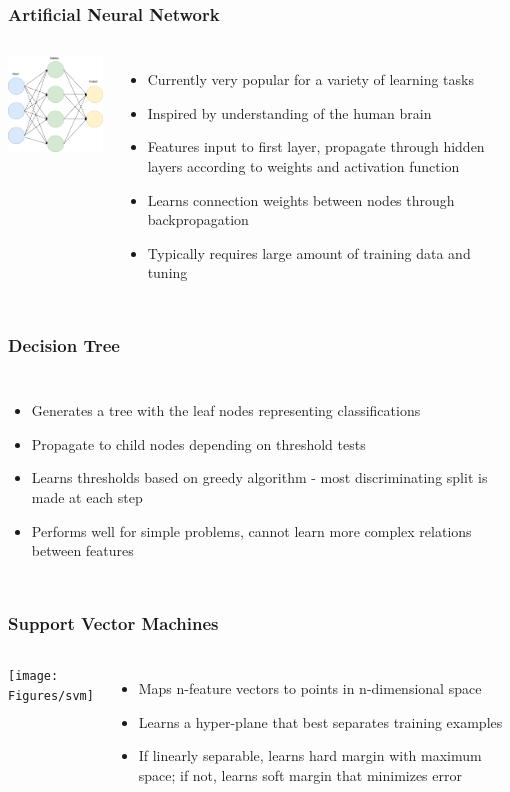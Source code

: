 \documentclass{beamer}
\begin{document}
\begin{frame}
\frametitle{Artificial Neural Network}
\begin{columns}
\includegraphics[width = 4.5cm]{Figures/NN}
\begin{itemize}
  \item Currently very popular for a variety of learning tasks
  \item Inspired by understanding of the human brain
  \item Features input to first layer, propagate through hidden layers according to weights and activation function
  \item Learns connection weights between nodes through backpropagation
  \item Typically requires large amount of training data and tuning
\end{itemize}
\end{columns}
\end{frame}


\begin{frame}
\frametitle{Decision Tree}
\begin{columns}
  \begin{itemize}
    \item Generates a tree with the leaf nodes representing classifications
    \item Propagate to child nodes depending on threshold tests 
    \item Learns thresholds based on greedy algorithm - most discriminating split is made at each step
    \item Performs well for simple problems, cannot learn more complex relations between features
  \end{itemize}
  \scalebox{0.7}{}
  \end{columns}
\end{frame}


\begin{frame}
\frametitle{Support Vector Machines}
\begin{columns}
\texttt{[image: Figures/svm]}
\begin{itemize}
  \item Maps n-feature vectors to points in n-dimensional space
  \item Learns a hyper-plane that best separates training examples
  \item If linearly separable, learns hard margin with maximum space; if not, learns soft margin that minimizes error
\end{itemize}
\end{columns}
\end{frame}
\end{document}
